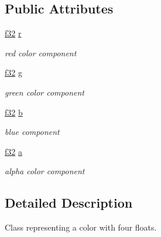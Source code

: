 \subsection*{Public Attributes}
\begin{DoxyCompactItemize}
\item 
\mbox{\label{classirr_1_1video_1_1SColorf_aaabdd1e2ef53f24e9dec70d5d531e425}} 
\hyperlink{namespaceirr_a0277be98d67dc26ff93b1a6a1d086b07}{f32} \hyperlink{classirr_1_1video_1_1SColorf_aaabdd1e2ef53f24e9dec70d5d531e425}{r}
\begin{DoxyCompactList}\small\item\em red color component \end{DoxyCompactList}\item 
\mbox{\label{classirr_1_1video_1_1SColorf_abcb076ccba5f994d6dca52aed397d59a}} 
\hyperlink{namespaceirr_a0277be98d67dc26ff93b1a6a1d086b07}{f32} \hyperlink{classirr_1_1video_1_1SColorf_abcb076ccba5f994d6dca52aed397d59a}{g}
\begin{DoxyCompactList}\small\item\em green color component \end{DoxyCompactList}\item 
\mbox{\label{classirr_1_1video_1_1SColorf_a82d235f32be8c4a5a07acb45abde726e}} 
\hyperlink{namespaceirr_a0277be98d67dc26ff93b1a6a1d086b07}{f32} \hyperlink{classirr_1_1video_1_1SColorf_a82d235f32be8c4a5a07acb45abde726e}{b}
\begin{DoxyCompactList}\small\item\em blue component \end{DoxyCompactList}\item 
\mbox{\label{classirr_1_1video_1_1SColorf_add63387fd1fd80d09500b85ae679b050}} 
\hyperlink{namespaceirr_a0277be98d67dc26ff93b1a6a1d086b07}{f32} \hyperlink{classirr_1_1video_1_1SColorf_add63387fd1fd80d09500b85ae679b050}{a}
\begin{DoxyCompactList}\small\item\em alpha color component \end{DoxyCompactList}\end{DoxyCompactItemize}


\subsection{Detailed Description}
Class representing a color with four floats. 

